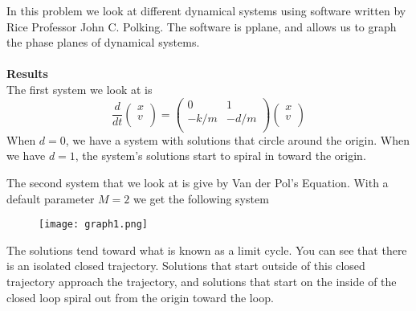 \begin{exercise}{1}
	In this problem we look at different dynamical systems using software written by Rice Professor John C. Polking. The software is pplane, and allows us to graph the phase planes of dynamical systems.
	\\
	\\
	\textbf{Results}\\
	The first system we look at is 
	\[\frac{d}{dt} \begin{pmatrix} x \\ v\\ \end{pmatrix} = 
	  \begin{pmatrix}
	  	0 & 1\\
	  	-k/m & -d/m \\
	  \end{pmatrix}
	  \begin{pmatrix}
	  	x \\ v\\
	  \end{pmatrix}
	\]
	When $d = 0$, we have a system with solutions that circle around the origin. When we have $d = 1$, the system's solutions start to spiral in toward the origin.

	The second system that we look at is give by Van der Pol's Equation. With a default parameter $M = 2$ we get the following system \\

	\begin{figure}[!h]
		\texttt{[image: graph1.png]}
	\end{figure}
	The solutions tend toward what is known as a limit cycle. You can see that there is an isolated closed trajectory. Solutions that start outside of this closed trajectory approach the trajectory, and solutions that start on the inside of the closed loop spiral out from the origin toward the loop.
\end{exercise}